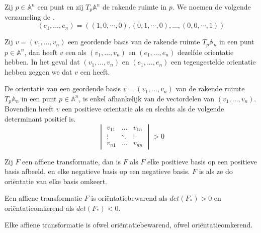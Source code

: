 \documentclass[main.tex]{subfiles}
\begin{document}
\begin{de}
  Zij $p\in \mathbb{A}^{n}$ een punt en zij $T_{p}\mathbb{A}^{n}$ de rakende ruimte in $p$.
  We noemen de volgende verzameling de .
  \[
  (e_{1},\dotsc, e_{n}) =
  (
    (1,0,\cdots,0),
    (0,1,\cdots,0),
    \dotsc,
    (0,0,\cdots,1)
    )
  \]
\end{de}

\begin{de}
  Zij $v = (v_{1},\dotsc,v_{n})$ een geordende basis van de rakende ruimte $T_{p}\mathbb{A}_{n}$ in een punt $p\in \mathbb{A}^{n}$, dan heeft $v$ een  als $(v_{1},\dotsc,v_{n})$ en $(e_{1},\dotsc, e_{n})$ dezelfde orientatie hebben. In het geval dat $(v_{1},\dotsc,v_{n})$ en $(e_{1},\dotsc, e_{n})$ een tegengestelde orientatie hebben zeggen we dat $v$ een  heeft.
\end{de}

\begin{st}
  De orientatie van een geordende basis $v = (v_{1},\dotsc,v_{n})$ van de rakende ruimte $T_{p}\mathbb{A}_{n}$ in een punt $p\in \mathbb{A}^{n}$, is enkel afhankelijk van de vectordelen van $(v_{1},\dotsc,v_{n})$.
  Bovendien heeft $v$ een positieve orientatie als en slechts als de volgende determinant positief is.
  \[ 
  \begin{vmatrix}
    v_{11} & \hdots & v_{1n} \\
    \vdots & \ddots & \vdots \\
    v_{n1} & \hdots & v_{nn}
  \end{vmatrix}
  > 0
  \]
\end{st}

\begin{de}
  Zij $F$ een affiene transformatie, dan is $F$  als $F$ elke positieve basis op een positieve basis afbeeld, en elke negatieve basis op een negatieve basis.
  $F$ is  als ze do ori\"entatie van elke basis omkeert.
\end{de}

\begin{st}
  Een affiene transformatie $F$ is ori\"entatiebewarend als $det(F_{*}) > 0$ en ori\"entatieomkerend als $det(F_{*}) < 0$.
\end{st}

\begin{st}
  Elke affiene transformatie is ofwel ori\"entatiebewarend, ofwel ori\"entatieomkerend.
\end{st}
\end{document}
